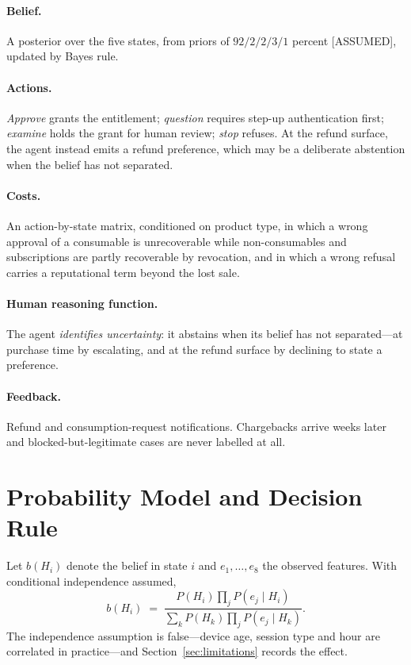 \documentclass{article}
\begin{document}
\paragraph{Belief.} A posterior over the five states, from priors of
$92/2/2/3/1$ percent [ASSUMED], updated by Bayes rule.

\paragraph{Actions.} \emph{Approve} grants the entitlement; \emph{question} requires
step-up authentication first; \emph{examine} holds the grant for human review;
\emph{stop} refuses. At the refund surface, the agent instead emits a refund preference,
which may be a deliberate abstention when the belief has not separated.

\paragraph{Costs.} An action-by-state matrix, conditioned on product type, in which a wrong
approval of a consumable is unrecoverable while non-consumables and subscriptions are
partly recoverable by revocation, and in which a wrong refusal carries a reputational term
beyond the lost sale.

\paragraph{Human reasoning function.} The agent \emph{identifies uncertainty}: it abstains
when its belief has not separated---at purchase time by escalating, and at the refund
surface by declining to state a preference.

\paragraph{Feedback.} Refund and consumption-request notifications. Chargebacks arrive
weeks later and blocked-but-legitimate cases are never labelled at all.

\section{Probability Model and Decision Rule}
\label{sec:model}

Let $b(H_i)$ denote the belief in state $i$ and $e_1,\dots,e_8$ the observed features. With
conditional independence assumed,
\begin{equation}
b(H_i) \;=\; \frac{P(H_i)\prod_{j} P(e_j \mid H_i)}{\sum_{k} P(H_k)\prod_{j} P(e_j \mid H_k)} .
\end{equation}
The independence assumption is false---device age, session type and hour are correlated in
practice---and Section~\ref{sec:limitations} records the effect.
\end{document}
